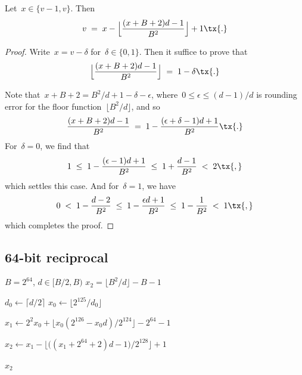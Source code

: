 \documentclass[12pt,oneside,draft]{scrartcl}
\begin{document}
\begin{proposition}
\label{prop:final_step}
Let\/~$x \in \{v - 1, v\}$.  Then
\begin{gather}
  v
\;=\;
  x - \Bigl\lfloor \frac{(x + B + 2) d - 1}{B^{2}} \Bigr\rfloor + 1
\tx{.}
\label{eq:prop:final_step}
\end{gather}
\end{proposition}
\begin{proof}
Write~$x = v - \delta$ for~$\delta \in \{0, 1\}$.  Then it suffice to prove that
\begin{gather*}
  \Bigl\lfloor \frac{(x + B + 2) d - 1}{B^{2}} \Bigr\rfloor
\;=\;
  1 - \delta
\tx{.}
\end{gather*}

Note that~$x + B + 2 = B^{2} / d + 1 - \delta - \epsilon$, where~$0 \le \epsilon \le (d - 1) / d$ is rounding error for the floor function~$\lfloor B^{2} / d \rfloor$, and so
\begin{gather*}
  \frac{(x + B + 2) d - 1}{B^{2}}
\;=\;
  1 - \frac{(\epsilon + \delta - 1) d + 1}{B^{2}}
\tx{.}
\end{gather*}
For~$\delta = 0$, we find that
\begin{gather*}
  1
\;\le\;
  1 - \frac{(\epsilon - 1) d + 1}{B^{2}}
\;\le\;
  1 + \frac{d - 1}{B^{2}}
\;<\;
  2
\tx{,}
\end{gather*}
which settles this case.  And for~$\delta = 1$, we have
\begin{gather*}
  0
\;<\;
  1 - \frac{d - 2}{B^{2}}
\;\le\;
  1 - \frac{\epsilon d + 1}{B^{2}}
\;\le\;
  1 - \frac{1}{B^{2}}
\;<\;
  1
\tx{,}
\end{gather*}
which completes the proof.
\end{proof}

\subsection{64-bit reciprocal}

\begin{algorithm}
\caption{Precomputed reciprocal~$v$ for~$B = 2^{64}$ with 64-bit word size and 63-bit initial estimate.}
\label{alg:reciprocal64}
\begin{algorithmic}[1]
\Require $B = 2^{64}$, $d \in [B / 2, B)$
\Ensure $x_{2} = \lfloor B^{2} / d \rfloor - B - 1$

\State $d_{0} \gets \lceil d / 2 \rceil$
\State $x_{0} \gets \lfloor 2^{125} / d_{0} \rfloor$

\State $x_{1} \gets 2^{2} x_{0} + \lfloor x_{0} ( 2^{126} - x_{0} d) / 2^{124} \rfloor - 2^{64} - 1$

\State $x_{2} \gets x_{1} - \bigl\lfloor \bigl( (x_{1} + 2^{64} + 2) d - 1 \bigr) / 2^{128} \bigr\rfloor + 1$

\State \Return $x_{2}$
\end{algorithmic}
\end{algorithm}
\end{document}
